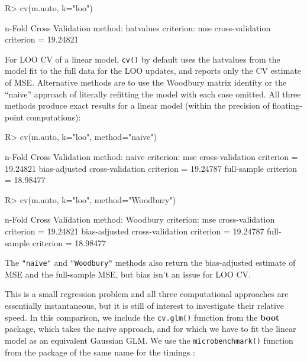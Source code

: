 \documentclass[
]{jss}
\begin{document}
\begin{CodeChunk}
\begin{CodeInput}
R> cv(m.auto, k="loo")
\end{CodeInput}
\begin{CodeOutput}
n-Fold Cross Validation
method: hatvalues
criterion: mse
cross-validation criterion = 19.24821
\end{CodeOutput}
\end{CodeChunk}

For LOO CV of a linear model, \texttt{cv()} by default uses the
hatvalues from the model fit to the full data for the LOO updates, and
reports only the CV estimate of MSE. Alternative methods are to use the
Woodbury matrix identity or the ``naive'' approach of literally
refitting the model with each case omitted. All three methods produce
exact results for a linear model (within the precision of floating-point
computations):

\begin{CodeChunk}
\begin{CodeInput}
R> cv(m.auto, k="loo", method="naive")
\end{CodeInput}
\begin{CodeOutput}
n-Fold Cross Validation
method: naive
criterion: mse
cross-validation criterion = 19.24821
bias-adjusted cross-validation criterion = 19.24787
full-sample criterion = 18.98477 
\end{CodeOutput}
\begin{CodeInput}
R> cv(m.auto, k="loo", method="Woodbury")
\end{CodeInput}
\begin{CodeOutput}
n-Fold Cross Validation
method: Woodbury
criterion: mse
cross-validation criterion = 19.24821
bias-adjusted cross-validation criterion = 19.24787
full-sample criterion = 18.98477 
\end{CodeOutput}
\end{CodeChunk}

The \texttt{"naive"} and \texttt{"Woodbury"} methods also return the
bias-adjusted estimate of MSE and the full-sample MSE, but bias isn't an
issue for LOO CV.

This is a small regression problem and all three computational
approaches are essentially instantaneous, but it is still of interest to
investigate their relative speed. In this comparison, we include the
\texttt{cv.glm()} function from the \textbf{boot} package, which takes
the naive approach, and for which we have to fit the linear model as an
equivalent Gaussian GLM. We use the \texttt{microbenchmark()} function
from the package of the same name for the timings \citep{Mersmann:2023}:
\end{document}
